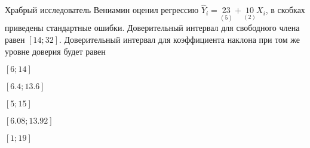 
\begin{question}
Храбрый исследователь Вениамин оценил регрессию
\(\hat Y_i = \underset{(5)}{23} + \underset{(2)}{10}X_i\), в скобках
приведены стандартные ошибки. Доверительный интервал для свободного
члена равен \([14; 32]\). Доверительный интервал для коэффициента
наклона при том же уровне доверия будет равен
\begin{answerlist}
  \item \([6; 14]\)
  \item \([6.4; 13.6]\)
  \item \([5; 15]\)
  \item \([6.08; 13.92]\)
  \item \([1; 19]\)
\end{answerlist}
\end{question}


